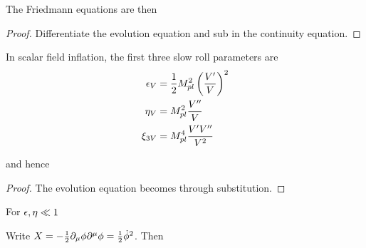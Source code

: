 \documentclass{article}
\begin{document}
The Friedmann equations are then 

\begin{prop}\label{prop:CSM:1}
\end{prop}
\begin{proof}
Differentiate the evolution equation and sub in the continuity equation. 
\end{proof}

\begin{definition}
In scalar field inflation, the first three slow roll parameters are 
\begin{align}\label{eq:CSM:13}
\epsilon_V &= \frac{1}{2} M_{pl}^2 \left( \frac{V^\prime}{V} \right)^2 \\
\eta_V &= M_{pl}^2 \frac{V^{\prime\prime}}{V} \\
\xi_{3V} &= M_{pl}^4 \frac{V^\prime V^{\prime\prime}}{V^2}
\end{align}
\end{definition}

\begin{prop}
and hence 
\end{prop}
\begin{proof}
The evolution equation becomes 
through substitution.
\end{proof}

\begin{corollary}
For $\epsilon,\eta \ll 1$
\end{corollary}

\begin{definition}
Write $X = -\frac{1}{2} \partial_\mu \phi \partial^\mu \phi = \frac{1}{2}\dot{\phi}^2$. Then 
\end{definition}
\end{document}
